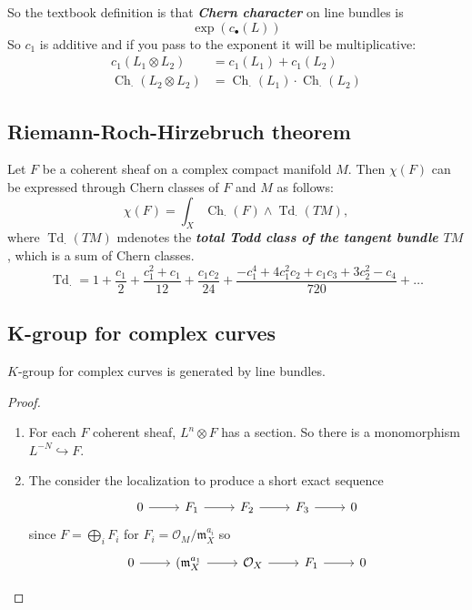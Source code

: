 So the textbook definition is that \textit{\textbf{Chern character}} on line bundles is
 \[\operatorname{exp}(c_{\bullet}(L))\]
 So $c_1$ is additive and if you pass to the exponent it will be multiplicative:
 \begin{align*}
 	c_1(L_1\otimes L_2)&=c_1(L_1)+c_1(L_2)\\
	\operatorname{Ch}_{\cdot}(L_2\otimes L_2)&=\operatorname{Ch}_{\cdot}(L_1)\cdot \operatorname{Ch}_{\cdot}(L_2)
 \end{align*}

\subsection{Riemann-Roch-Hirzebruch theorem}

\begin{thm}[RRH]\leavevmode
	Let $F$ be a coherent sheaf on a complex compact manifold $M$. Then $\chi(F)$ can be expressed through Chern classes of $F$ and $M$ as follows:
	\[\chi(F)=\int_{X}\operatorname{Ch}_{\cdot}(F)\wedge \operatorname{Td}_{\cdot}(TM),\]
	where $\operatorname{Td}_{\cdot}(TM)$ mdenotes the \textit{\textbf{total Todd class of the tangent bundle $TM$}}, which is a sum of Chern classes.
	\[\operatorname{Td}_{\cdot}=1+\frac{c_1}{2}+\frac{c_1^2+c_1}{12}+\frac{c_1c_2}{24}+\frac{-c_1^4+4c_1^2c_2+c_1c_3+3c_2^2-c_4}{720}+\ldots\]
\end{thm}

\subsection{K-group for complex curves}

\begin{lemma}
	$K$-group for complex curves is generated by line bundles.
\end{lemma}

\begin{proof}\leavevmode 

	\begin{enumerate}[label=\textbf{Step \arabic*}]
		\item For each $F$ coherent sheaf, $L^n\otimes F$ has a section. So there is a monomorphism $L^{-N}\hookrightarrow F$.

		\item The consider the localization to produce a short exact sequence
			\[\begin{tikzcd}
				0\arrow[r]&F_1\arrow[r]&F_2\arrow[r]&F_3\arrow[r]&0
			\end{tikzcd}\]
			since $F=\bigoplus_{i} F_i $ for $F_i=\mathcal{O}_{M}/\mathfrak{m}_{X}^{a_i}$ so
			\[\begin{tikzcd}
				0\arrow[r]&(\mathfrak{m}_{X}^{a_1}\arrow[r]&\mathcal{O}_{X}\arrow[r]&F_1\arrow[r]&0
			\end{tikzcd}\]
	\end{enumerate}
\end{proof}

